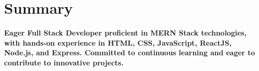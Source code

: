 
\section{Summary}

\paragraph{Eager Full Stack Developer proficient in MERN Stack technologies, with hands-on experience in HTML, CSS, JavaScript, ReactJS, Node.js, and Express. Committed to continuous learning and eager to contribute to innovative projects.}

